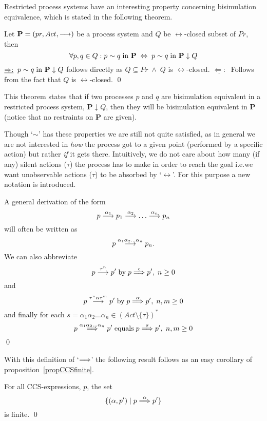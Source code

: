 \noindent
Restricted process systems have an interesting property concerning bisimulation equivalence, which is stated in the following theorem.

\begin{theorem}
Let $\hbox{\bf P} = (pr, Act, \stackrel{}{\longrightarrow})$ be a process system and $Q$ be $\rel{}$-closed subset of $Pr$, then
\[
\forall p,q\in Q: p\sim q\;\hbox{in \bf P}\;\Leftrightarrow\; p\sim q\;\hbox{in \bf P}\downarrow Q
\]
\proof\linebreak[4]
$\underline{\Rightarrow :}\;\;p\sim q\;\hbox{in \bf P}\downarrow Q$ follows directly as $Q\subseteq Pr\;\wedge\; Q$ is $\rel{}$-closed.
\linebreak[4]
$\underline{\Leftarrow :}\;$ Follows from the fact that $Q$ is $\rel{}$-closed.
\qed
\end{theorem}


\noindent
This theorem states that if two processes $p$ and $q$ are bisimulation equivalent in a restricted process system, {\bf P}$\downarrow Q$, then they will be bisimulation equivalent in {\bf P} (notice that no restraints on {\bf P} are given).

Though `$\sim$' has these properties we are still not quite satisfied, as in general we are not interested in {\it how\/} the process got to a given point (performed by a specific action) but rather {\it if\/} it gets there. Intuitively, we do not care about how many (if any) silent actions ($\tau$) the process has to make in order to reach the goal i.e.\@ we want unobservable actions ($\tau$) to be absorbed by `$\rel{}$'. For this purpose a new notation is introduced.

\begin{notation}
A general derivation of the form
\[
p\stackrel{\alpha_1}{\longrightarrow}p_1\stackrel{\alpha_2}{\longrightarrow}\ldots \stackrel{\alpha_n}{\longrightarrow}p_n
\]
\noindent
will often be written as
\[
p\stackrel{\alpha_1\alpha_2\ldots\alpha_n}{\longrightarrow}p_n.
\]
We can also abbreviate
\[
p\stackrel{\tau^n}{\longrightarrow}p'\;\hbox{by}\;p\stackrel{\epsilon}{\Longrightarrow}p',\; n\geq0
\]
and
\[
p\stackrel{\tau^n\alpha\tau^m}{\longrightarrow}p'\;\hbox{by}\;p\stackrel{\alpha}{\Longrightarrow}p',\; n,m\geq0
\]
and finally for each $s=\alpha_1\alpha_2\ldots\alpha_n \in (Act\setminus\{\tau\})^*$
\[
p\stackrel{\alpha_1\alpha_2\ldots\alpha_n}{\Longrightarrow}p'\;\hbox{equals}\;p\stackrel{s}{\Longrightarrow}p',\; n,m\geq0
\]
\qed
\end{notation}

\noindent
With this definition of `$\stackrel{}{\Longrightarrow}$' the following result follows as an easy corollary of proposition~\ref{propCCSfinite}.

\begin{corollary}
For all CCS-expressions, $p$, the set
\[
\{(\alpha,p')\mid p\stackrel{\alpha}{\Longrightarrow}p'\}
\]
is finite.
\qed
\end{corollary}

